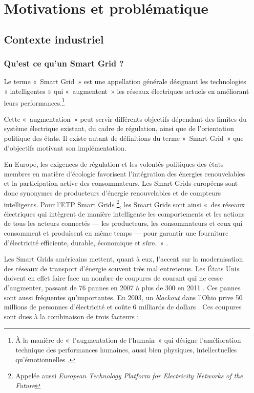\chapter{Motivations et problématique}
\label{ch:problematique}

\section{Contexte industriel}

\subsection{Qu'est ce qu'un Smart Grid ?}
Le terme «~Smart Grid~» est une appellation générale désignant les technologies « intelligentes » qui «~augmentent~» les réseaux électriques actuels en 
améliorant leurs performances.\footnote{À la manière de «~l'augmentation de 
l'humain~» qui désigne l'amélioration technique des performances humaines, aussi bien physiques, intellectuelles qu'émotionnelles \cite{le2013humain}.}

Cette «~augmentation~» peut servir différents objectifs dépendant des limites du système électrique existant, du cadre de régulation, ainsi que de 
l'orientation politique des états. Il existe autant de définitions du terme 
«~Smart Grid~» que d'objectifs motivant son implémentation. 


En Europe, les exigences de régulation et les volontés politiques des états membres en matière d'écologie favorisent l'intégration 
des énergies renouvelables et la participation active des consommateurs. Les Smart Grids européens sont donc synonymes de producteurs d'énergie renouvelables et de compteurs intelligents. Pour l'ETP Smart Grids \footnote{Appelée aussi \textit{European Technology Platform for Electricity Networks of the Future}}, les Smart Grids sont ainsi «~des réseaux électriques qui intègrent de manière intelligente les comportements et les actions de tous les acteurs connectés — les producteurs, les consommateurs et ceux qui consomment et produisent en même temps — pour garantir une fourniture d'électricité efficiente, durable, économique et sûre.~» \cite{ETP}.

Les Smart Grids américains mettent, quant à eux, l'accent sur la modernisation des réseaux de transport d'énergie souvent très mal entretenus. Les États Unis doivent en effet faire face un nombre de 
coupures de courant qui ne cesse d'augmenter, passant de 76 pannes en 2007 à plus de 300 en 2011 \cite{detroit}. Ces pannes sont aussi fréquentes qu'importantes. En 2003, un \textit{blackout} dans l'Ohio prive 50 millions de personnes d'électricité et coûte 6 milliards de dollars \cite{andersson2005causes}. Ces coupures sont dues à la 
combinaison de trois facteurs \cite{outages}:

